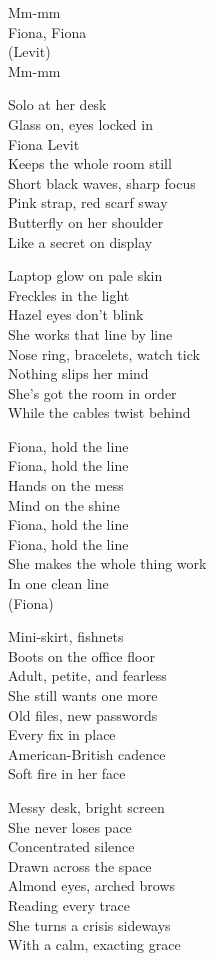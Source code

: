\begin{lyrics}

Mm-mm\\
Fiona, Fiona\\
(Levit)\\
Mm-mm

Solo at her desk\\
Glass on, eyes locked in\\
Fiona Levit\\
Keeps the whole room still\\
Short black waves, sharp focus\\
Pink strap, red scarf sway\\
Butterfly on her shoulder\\
Like a secret on display

Laptop glow on pale skin\\
Freckles in the light\\
Hazel eyes don’t blink\\
She works that line by line\\
Nose ring, bracelets, watch tick\\
Nothing slips her mind\\
She’s got the room in order\\
While the cables twist behind

Fiona, hold the line\\
Fiona, hold the line\\
Hands on the mess\\
Mind on the shine\\
Fiona, hold the line\\
Fiona, hold the line\\
She makes the whole thing work\\
In one clean line\\
(Fiona)

Mini-skirt, fishnets\\
Boots on the office floor\\
Adult, petite, and fearless\\
She still wants one more\\
Old files, new passwords\\
Every fix in place\\
American-British cadence\\
Soft fire in her face

Messy desk, bright screen\\
She never loses pace\\
Concentrated silence\\
Drawn across the space\\
Almond eyes, arched brows\\
Reading every trace\\
She turns a crisis sideways\\
With a calm, exacting grace


\end{lyrics}
